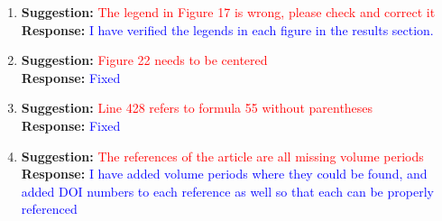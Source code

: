 \documentclass{article}
\newcommand\formatfeedback[2]
{%
	\textbf{Suggestion:} \textcolor{red}{#1} 
	\\[0.1in] \textbf{Response:} \textcolor{blue}{#2}
}
\begin{document}
\begin{enumerate}
			     {Thank you for noticing, I have unified the formula punctuation throughout the manuscript}
	\item \formatfeedback{The legend in Figure 17 is wrong, please check and correct it}
			     {I have verified the legends in each figure in the results section.}
        \item \formatfeedback{Figure 22 needs to be centered}
			     {Fixed}
	\item \formatfeedback{Line 428 refers to formula 55 without parentheses}{Fixed}
	\item \formatfeedback{The references of the article are all missing volume periods}{I have added volume periods where they could be found, and added DOI numbers to each reference as well so that each can be properly referenced}
\end{enumerate}
\end{document}
